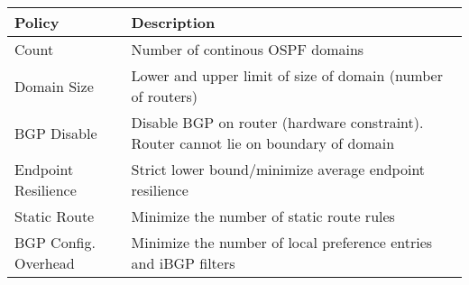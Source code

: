 \begin{table}[t!]
\begin{small}
	\begin{center}
		\begin{tabular}{m{6em} | m{18em} } 
			Policy & Description \\ 
			\hline
			Count & Number of continous OSPF domains  \\ \hline
			Domain Size  & Lower and upper
			limit of size of domain (number of routers) \\ \hline
			BGP \newline Disable & Disable BGP on router (hardware constraint). 
			Router cannot lie on boundary of domain \\ \hline
			Endpoint \newline Resilience & Strict lower bound/minimize average endpoint resilience \\ \hline
			Static Route & Minimize the number of static route rules \\ \hline
			BGP Config. Overhead & Minimize the number of local preference entries and
			iBGP filters
		\end{tabular}
	\end{center}
	 \label{tab:configpolicysupport} 
\end{small}
\end{table}
